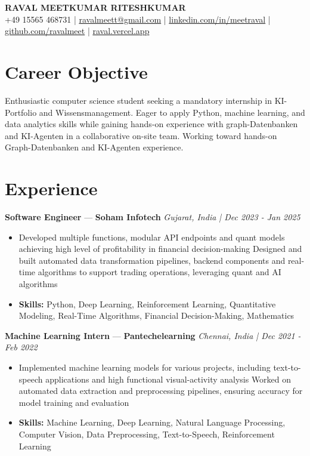 \documentclass[a4paper,10pt]{article}
\begin{document}
\begin{center}
  {\Large\bfseries RAVAL MEETKUMAR RITESHKUMAR}\\[2pt]
  {\small +49 15565 468731 \;|\; \href{mailto:ravalmeett@gmail.com}{ravalmeett@gmail.com} \;|\; \href{https://www.linkedin.com/in/meetraval/}{linkedin.com/in/meetraval} \;|\; \href{https://github.com/ravalmeet}{github.com/ravalmeet} \;|\; \href{https://raval.vercel.app/}{raval.vercel.app}}
\end{center}
\vspace{-3pt}

\section*{Career Objective}
Enthusiastic computer science student seeking a mandatory internship in KI-Portfolio and Wissensmanagement. Eager to apply Python, machine learning, and data analytics skills while gaining hands-on experience with graph-Datenbanken and KI-Agenten in a collaborative on-site team. Working toward hands-on Graph-Datenbanken and KI-Agenten experience.\par

\section*{Experience}
\textbf{Software Engineer} — \textbf{Soham Infotech} \hfill \textit{Gujarat, India \;|\; Dec 2023 - Jan 2025}\par
\vspace{1pt}
\begin{itemize}
  \item Developed multiple functions, modular API endpoints and quant models achieving high level of profitability in financial decision-making Designed and built automated data transformation pipelines, backend components and real-time algorithms to support trading operations, leveraging quant and AI algorithms
  \item \textbf{Skills:} Python, Deep Learning, Reinforcement Learning, Quantitative Modeling, Real-Time Algorithms, Financial Decision-Making, Mathematics
\end{itemize}
\vspace{3pt}
\textbf{Machine Learning Intern} — \textbf{Pantechelearning} \hfill \textit{Chennai, India \;|\; Dec 2021 - Feb 2022}\par
\vspace{1pt}
\begin{itemize}
  \item Implemented machine learning models for various projects, including text-to-speech applications and high functional visual-activity analysis Worked on automated data extraction and preprocessing pipelines, ensuring accuracy for model training and evaluation
  \item \textbf{Skills:} Machine Learning, Deep Learning, Natural Language Processing, Computer Vision, Data Preprocessing, Text-to-Speech, Reinforcement Learning
\end{itemize}
\end{document}
